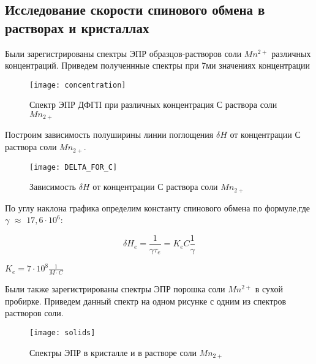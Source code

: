 \documentclass[a4paper,12pt]{article}
\begin{document}
	\subsection{Исследование скорости спинового обмена в растворах и кристаллах}	
	
	Были зарегистрированы спектры ЭПР образцов-растворов соли $Mn^{2+}$ различных концентраций. Приведем полученнные спектры при 7ми значениях концентрации 	


	\begin{figure}[H]
		\begin{center}
			\texttt{[image: concentration]}
			\caption{ Спектр ЭПР ДФГП при различных концентрация С раствора соли $Mn_{2+}$}
		\end{center}
	\end{figure}
	
	
	
\newpage
	Построим зависимость полуширины линии поглощения $\delta H$ от концентрации С раствора соли $Mn_{2+}$.
	
	\begin{figure}[H]
		\begin{center}
			\texttt{[image: DELTA\_FOR\_C]}
			\caption{Зависимость $\delta H$ от концентрации С раствора соли $Mn_{2+}$}
		\end{center}
	\end{figure}
	
	По углу наклона графика определим константу спинового обмена по формуле,где $\gamma$ $\approx$ $17,6 \cdot 10^6$:
	
	\begin{equation}
	\delta H_e = \frac{1}{\gamma \tau_e} = K_e C \frac{1}{\gamma}
	\end{equation}
	
	\begin{center}
	$K_e = 7 \cdot 10^8 \frac{1}{M \cdot C}$
	\end{center}
		
	
 	Были также зарегистрированы спектры ЭПР порошка соли $Mn^{2+}$ в сухой пробирке. Приведем данный спектр на одном рисунке с одним из спектров растворов соли.
 	
 	
 	\begin{figure}[H]
		\begin{center}
			\texttt{[image: solids]}
			\caption{Спектры ЭПР в кристалле и в растворе соли $Mn_{2+}$}
		\end{center}
	\end{figure}
	
\end{document}
